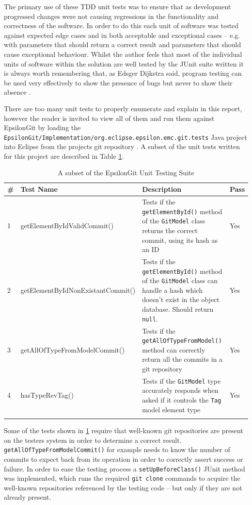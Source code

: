 \documentclass[11pt]{book}
\newcommand{\code}[1]{\texttt{#1}}
\begin{document}
The primary use of these TDD unit tests was to ensure that as development progressed changes were not causing regressions in the functionality and correctness of the software. In order to do this each unit of software was tested against expected edge cases and in both acceptable and exceptional cases -- e.g. with parameters that should return a correct result and parameters that should cause exceptional behaviour. Whilst the author feels that most of the individual units of software within the solution are well tested by the JUnit suite written it is always worth remembering that, as Edsger Dijkstra said, program testing can be used very effectively to show the presence of bugs but never to show their absence \cite{edsger}.

There are too many unit tests to properly enumerate and explain in this report, however the reader is invited to view all of them and run them against EpsilonGit by loading the \\  \code{EpsilonGit/Implementation/org.eclipse.epsilon.emc.git.tests} Java project into Eclipse from the projects git repository \cite{epsilongitgithub}. A subset of the unit tests written for this project are described in Table \ref{tab:unittests}.

\begin{longtable}{|l|p{6.5cm}|p{6.5cm}|p{1cm}|}
	\hline
	\textbf{\#}  & \textbf{Test Name} & \textbf{Description} & \textbf{Pass} \\ \hline
	1  & getElementByIdValidCommit()			  &	Tests if the \code{getElementById()} method of the \code{GitModel} class returns the correct commit, using its hash as an ID			& Yes	   \\ \hline
	2  & getElementByIdNonExistantCommit()			  &	Tests if the \code{getElementById()} method of the \code{GitModel} class can handle a hash which doesn't exist in the object database. Should return \code{null}.			& Yes	   \\ \hline
	3  & getAllOfTypeFromModelCommit()			  &	Tests if the \code{getAllOfTypeFromModel()} method can correctly return all the commits in a git repository			& Yes	   \\ \hline
	4  & hasTypeRevTag()			  &	Tests if the \code{GitModel} type accurately responds when asked if it controls the \code{Tag} model element type 			& Yes	   \\ \hline
	\caption{A subset of the EpsilonGit Unit Testing Suite}
	\label{tab:unittests}
\end{longtable}

Some of the tests shown in \ref{tab:unittests} require that well-known git repositories are present on the testers system in order to determine a correct result. \code{getAllOfTypeFromModelCommit()} for example needs to know the number of commits to expect back from its operation in order to correctly assert success or failure. In order to ease the testing process a \code{setUpBeforeClass()} JUnit method was implemented, which runs the required \code{git clone} commands to acquire the well-known repositories referenced by the testing code -- but only if they are not already present.
\end{document}
